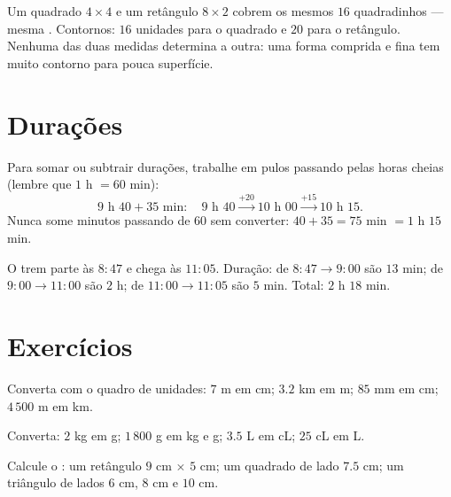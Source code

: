 \begin{example}\label{ex:g4:measure:samearea}
Um quadrado $4 \times 4$ e um retângulo $8 \times 2$ cobrem os mesmos
$16$ quadradinhos --- mesma . Contornos: $16$ unidades para o
quadrado e $20$ para o retângulo. Nenhuma das duas medidas determina
a outra: uma forma comprida e fina tem muito contorno para pouca
superfície.
\end{example}

\section{Durações}

\begin{method}\label{met:g4:measure:time}
Para somar ou subtrair durações, trabalhe em pulos passando pelas
horas cheias (lembre que $1$ h $= 60$ min):
\[
9\text{ h }40 + 35 \text{ min}:
\quad 9\text{ h }40 \xrightarrow{+20} 10\text{ h }00
\xrightarrow{+15} 10\text{ h }15 .
\]
Nunca some minutos passando de $60$ sem converter: $40 + 35 = 75$ min
$= 1$ h $15$ min.
\end{method}

\begin{example}\label{ex:g4:measure:timetable}
O trem parte às $8{:}47$ e chega às $11{:}05$. Duração: de
$8{:}47 \to 9{:}00$ são $13$ min; de $9{:}00 \to 11{:}00$ são $2$ h;
de $11{:}00 \to 11{:}05$ são $5$ min. Total: $2$ h $18$ min.
\end{example}

\section{Exercícios}

\begin{exercise}[$\star$]\label{exo:g4:measure:1}
Converta com o quadro de unidades: $7$ m em cm; $3.2$ km em m; $85$
mm em cm; $4\,500$ m em km.
\end{exercise}

\begin{exercise}[$\star$]\label{exo:g4:measure:2}
Converta: $2$ kg em g; $1\,800$ g em kg e g; $3.5$ L em cL;
$25$ cL em L.
\end{exercise}

\begin{exercise}[$\star$]\label{exo:g4:measure:3}
Calcule o : um retângulo $9$ cm $\times$ $5$ cm; um quadrado
de lado $7.5$ cm; um triângulo de lados $6$ cm, $8$ cm e $10$ cm.
\end{exercise}

